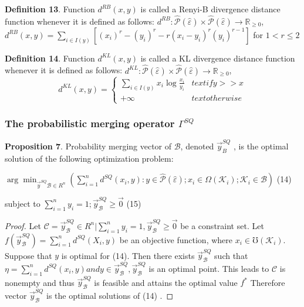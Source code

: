 \documentclass[]{iosart2c}
\begin{document}
  \textbf{Definition 13}. Function $d^{RB}(x, y)$ is called a Renyi-B divergence distance function whenever it is defined as follows: $d^{RB} : \hat{\mathcal{P}}(\hat{\varepsilon}) \times \hat{\mathcal{P}} (\hat{\varepsilon}) \to \mathbb{R}_{\ge 0}$, $d^{RB}(x, y)=\sum_{i\in I(y)}[(x_i)^r - (y_i)^r - r(x_i - y_i)^r(y_i)^{r-1}]$ for $1 < r \le 2$

  \textbf{Definition 14}. Function $d^{KL}(x, y)$ is called a KL divergence distance function whenever it is defined as follows: $d^{KL} : \hat{\mathcal{P}} (\hat{\varepsilon}) \times \hat{\mathcal{P}} (\hat{\varepsilon}) \to \mathbb{R}_{\geq0}$, $$d^{KL}(x, y) =
  \begin{cases}
    \sum_{i \in I(y)} {x_i \log{\frac{x_i}{y_i}}} &text{if} y >> x \\
    +\infty    &text{otherwise}
  \end{cases}
  $$

  \subsubsection{The probabilistic merging operator $\Gamma^{SQ}$}

  \textbf{Proposition 7}. Probability merging vector of $\mathcal{B}$, denoted $\vec{y}^{SQ}_B$ , is the optimal solution of the following optimization problem:

  $\arg \min_{\vec{y}^{SQ}\mathcal{B} \in R^n}\left( \sum^n_{i=1} d^{SQ}(x_i, y) : y \in \hat{\mathcal{P}} (\hat{\varepsilon});x_i \in \Omega(\mathcal{K}_i);\mathcal{K}_i \in \mathcal{B} \right)$ (14)

  subject to $\sum^n_{i=1}y_i = 1;\vec{y}^{SQ}_\mathcal{B} \geq \vec{0}$ (15)

  \begin{proof}
    Let $\mathcal{C} = {\vec{y}^{SQ}_\mathcal{B} \in R^n | \sum^n_{i=1}  y_i = 1, \vec{y}^{SQ}_\mathcal{B} \geq \vec{0}}$ be a constraint set. Let $f(\vec{y}^{SQ}_\mathcal{B} ) = \sum^n_{i=1} d^{SQ}(X_i, y)$ be an objective function, where $x_i \in \mho(\mathcal{K}_i)$. Suppose that $y$ is optimal for (14). Then there exists $\vec{y}^{SQ}_\mathcal{B}$ such that $\eta = \sum^n_{i=1} d^{SQ}(x_i, y) and y \in \vec{y}^{SQ}_\mathcal{B} , \vec{y}^{SQ}_\mathcal{B}$ is an optimal point. This leads to $\mathcal{C}$ is nonempty and thus $\vec{y}^{SQ}_\mathcal{B}$ is feasible and attains the optimal value $f^*$ Therefore vector $\vec{y}^{SQ}_\mathcal{B}$ is the optimal solutions of (14) \cite{25} .
  \end{proof}
\end{document}

